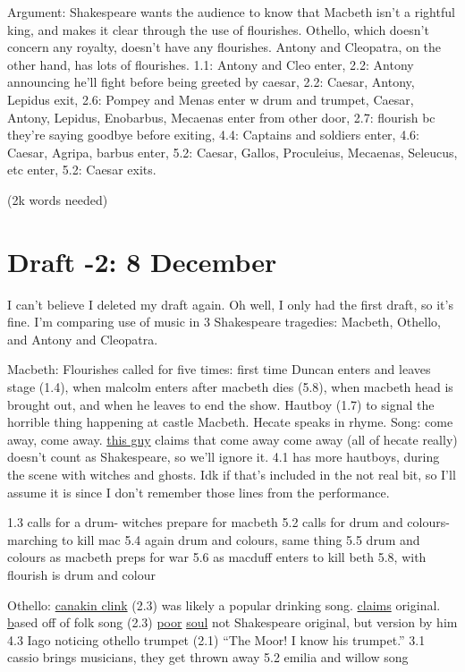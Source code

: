 \documentclass[12pt]{article}[titlepage]
\newcommand{\say}[1]{``#1''}
\newcommand{\1}{\={a}}
\newcommand{\2}{\={e}}
\newcommand{\3}{\={\i}}
\newcommand{\4}{\=o}
\newcommand{\5}{\=u}
\newcommand{\6}{\={A}}
\renewcommand{\,}{\textsuperscript{,}}
\begin{document}
Argument: Shakespeare wants the audience to know that Macbeth isn't a rightful king, and makes it clear through the use of flourishes.
Othello, which doesn't concern any royalty, doesn't have any flourishes.
Antony and Cleopatra, on the other hand, has lots of flourishes.
1.1: Antony and Cleo enter,
2.2: Antony announcing he'll fight before being greeted by caesar,
2.2: Caesar, Antony, Lepidus exit,
2.6: Pompey and Menas enter w drum and trumpet, Caesar, Antony, Lepidus, Enobarbus, Mecaenas enter from other door,
2.7: flourish bc they're saying goodbye before exiting,
4.4: Captains and soldiers enter,
4.6: Caesar, Agripa, barbus enter,
5.2: Caesar, Gallos, Proculeius, Mecaenas, Seleucus, etc enter,
5.2: Caesar exits.

(2k words needed)
\section{Draft -2: 8 December}
I can't believe I deleted my draft again.
Oh well, I only had the first draft, so it's fine.
I'm comparing use of music in 3 Shakespeare tragedies: Macbeth, Othello, and Antony and Cleopatra.

Macbeth:
Flourishes called for five times: first time Duncan enters and leaves stage (1.4), when malcolm enters after macbeth dies (5.8), when macbeth head is brought out, and when he leaves to end the show.
Hautboy (1.7) to signal the horrible thing happening at castle Macbeth.
Hecate speaks in rhyme.
Song: come away, come away.
\href{https://doi.org/10.1093/mq/XLVII.1.22}{this guy} claims that come away come away (all of hecate really) doesn't count as Shakespeare, so we'll ignore it.
4.1 has more hautboys, during the scene with witches and ghosts.
Idk if that's included in the not real bit, so I'll assume it is since I don't remember those lines from the performance.

1.3 calls for a drum- witches prepare for macbeth
5.2 calls for drum and colours- marching to kill mac
5.4 again drum and colours, same thing
5.5 drum and colours as macbeth preps for war
5.6 as macduff enters to kill beth
5.8, with flourish is drum and colour

Othello:
\href{https://www.shakespeare.org.uk/explore-shakespeare/blogs/shakespeares-drinking-songs/}{canakin clink} (2.3) was likely a popular drinking song. \href{http://www.lieder.net/lieder/get_text.html?TextId=18061}{claims} original.
\href{http://www.lieder.net/lieder/get_text.html?TextId=31027} based off of folk song (2.3)
\href{http://www.lieder.net/lieder/get_text.html?TextId=14898}{poor} \href{https://www.shakespeare.org.uk/explore-shakespeare/blogs/shakespeares-saddest-song/}{soul} not Shakespeare original, but version by him 4.3
Iago noticing othello trumpet (2.1) \say{The Moor! I know his trumpet.}
3.1 cassio brings musicians, they get thrown away
5.2 emilia and willow song
\end{document}
